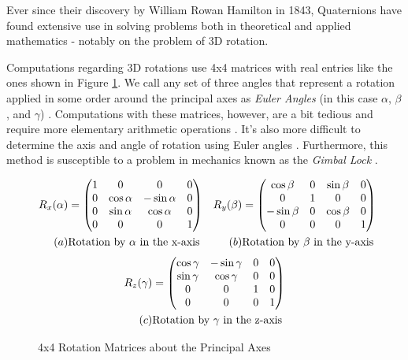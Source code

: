Ever since their discovery by William Rowan Hamilton in 1843, Quaternions have found extensive use in solving problems both in theoretical and applied mathematics - notably on the problem of 3D rotation. 

Computations regarding 3D rotations use 4x4 matrices with real entries like the ones shown in Figure \ref{4x4}. We call any set of three angles that represent a rotation applied in some order around the principal axes as \emph{Euler Angles} (in this case $\alpha$, $\beta$, and $\gamma$) \cite{lerios}. Computations with these matrices, however, are a bit tedious and require more elementary arithmetic operations \cite{lerios}. It's also more difficult to determine the axis and angle of rotation using Euler angles \cite{lerios}. Furthermore, this method is susceptible to a problem in mechanics known as the \emph{Gimbal Lock} \cite{jia}.

\begin{figure}[h]
	\begin{align*}
			{R}_{x}{(\alpha)} &=
			\begin{pmatrix}
				1 & 0 & 0 & 0 \\
				0 & \cos{\alpha} & -\sin{\alpha} & 0 \\
				0 & \sin{\alpha} & \cos{\alpha} & 0 \\
				0 & 0 & 0 & 1
			\end{pmatrix}
			&
			{R}_{y}{(\beta)} &=
			\begin{pmatrix}
				\cos{\beta} & 0 & \sin{\beta} & 0 \\
				0 & 1 & 0 & 0 \\
				-\sin{\beta} & 0 & \cos{\beta} & 0 \\
				0 & 0 & 0 & 1
			\end{pmatrix} \\
			(a) & \text{Rotation by $\alpha$ in the x-axis} 
			& 
			(b) & \text{Rotation by $\beta$ in the y-axis}	
	 \end{align*} 
		 \begin{align*}
			{R}_{z}{(\gamma)} &=
			\begin{pmatrix}
				\cos{\gamma} & -\sin{\gamma} & 0 & 0 \\
				\sin{\gamma} & \cos{\gamma} &  0 & 0 \\
				0 & 0 & 1 & 0 \\
				0 & 0 & 0 & 1
		 \end{pmatrix} \\
		 (c) & \text{Rotation by $\gamma$ in the z-axis}	
		\end{align*}
		\caption{4x4 Rotation Matrices about the Principal Axes}
		\label{4x4}
\end{figure}

